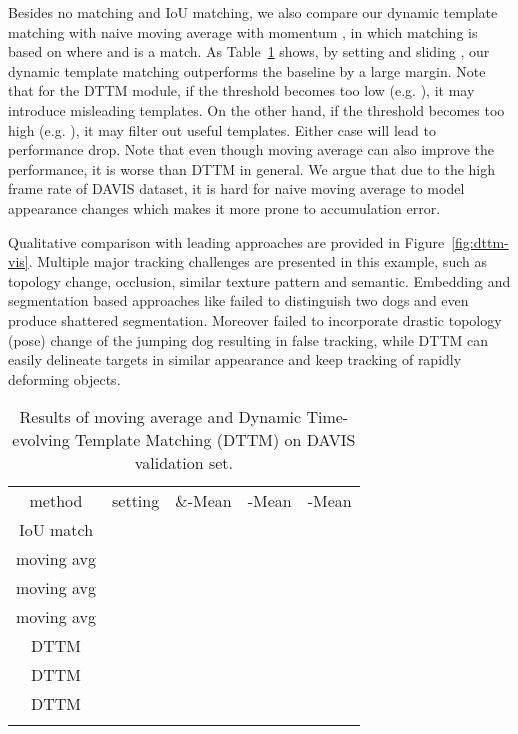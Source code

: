 \documentclass[10pt,twocolumn,letterpaper]{article}
\begin{document}
Besides no matching and IoU matching, we also compare our dynamic template matching with naive moving average with momentum , in which matching is based on  where  and  is a match.
As Table~\ref{table:ablation-dtt} shows, by setting  and sliding , our dynamic template matching outperforms the baseline by a large margin.
Note that for the DTTM module, if the threshold becomes too low (e.g. ), it may introduce misleading templates.
On the other hand, if the threshold becomes too high (e.g. ), it may filter out useful templates. Either case will lead to performance drop.
Note that even though moving average can also improve the performance, it is worse than DTTM in general.
We argue that due to the high frame rate of DAVIS dataset, it is hard for naive moving average to model appearance changes which makes it more prone to accumulation error.

Qualitative comparison with leading approaches are provided in Figure~\ref{fig:dttm-vis}.
Multiple major tracking challenges are presented in this example, such as topology change, occlusion, similar texture pattern and semantic. Embedding and segmentation based approaches like \cite{voigtlaender2019feelvos, caelles2017osvos, wang2019ranet} failed to distinguish two dogs and even produce shattered segmentation.
Moreover \cite{luiten2018premvos} failed to incorporate drastic topology (pose) change of the jumping dog resulting in false tracking, while DTTM can easily delineate targets in similar appearance and keep tracking of rapidly deforming objects.

\begin{table}[]
\small
\centering
\addtolength{\tabcolsep}{-1pt}
\begin{tabular}{@{\hspace{0mm}}c|c|c@{\hspace{2mm}}c@{\hspace{2mm}}c}
\Xhline{1.0pt}
method & setting & \&-Mean & -Mean & -Mean \\
\Xhline{1.0pt}
IoU match & &&& \\
\hline
moving avg &  &  &  &  \\
moving avg &  &  &  &  \\
moving avg &  &  &  & \\
\hline
DTTM &  &&&\\
DTTM &  &&&\\
DTTM &  &&&\\
\Xhline{1.0pt}
\end{tabular}
\caption{Results of moving average and Dynamic Time-evolving Template Matching (DTTM) on DAVIS validation set.}
    \vspace{-1.5em}
\label{table:ablation-dtt}
\end{table}
\end{document}
